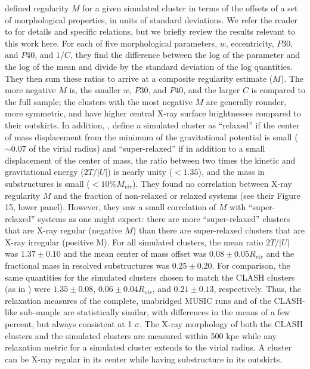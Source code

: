 \documentclass[iop,twocolumn]{emulateapj}
\begin{document}
{ \citet{meneghetti.etal.2014} defined regularity $M$ for a given simulated cluster in terms of the
offsets of a set of morphological properties, in units of standard deviations. 
We refer the reader to \citet{meneghetti.etal.2014} for
details and specific relations, but
we briefly review the results relevant to this work here. For each of five morphological parameters, 
$w$, eccentricity, $P30$, and $P40$, and $1/C$, they find the difference between the log of the parameter and
the log of the mean and divide by the standard deviation of the log quantities. 
They then sum these ratios to arrive at a composite regularity estimate ($M$). 
The more negative $M$ is, the smaller $w$, $P30$, and $P40$, and the larger $C$ is compared to the full sample; the
clusters with the most negative $M$ are generally rounder, more symmetric, and have higher central X-ray surface brightnesses compared to their outskirts. 
In addition, \citet{meneghetti.etal.2014}, define a simulated cluster as ``relaxed'' if the center of mass
displacement from the minimum of the gravitational potential is small ($\sim 0.07$ of the virial radius) 
and ``super-relaxed'' if in addition to a small displacement of the center of mass, 
the ratio between two times the kinetic and
gravitational energy ($2T/|U|$) is nearly unity ($<1.35$), and the mass in substructures is
small ($<10\% M_{vir}$). 
They found no correlation between X-ray regularity $M$ 
and the fraction of non-relaxed or  relaxed systems (see their Figure 15, lower panel). 
However, they saw a small correlation of $M$ with ``super-relaxed'' systems 
as one might expect: there are more ``super-relaxed'' clusters that are X-ray regular (negative $M$) 
than there are super-relaxed clusters that are X-ray irregular (positive M).
For all simulated clusters, the mean ratio $2T/|U|$  
was $1.37 \pm 0.10$ and the mean center of mass offset was $0.08 \pm 0.05 R_{vir}$
and the fractional mass in resolved substructures was $0.25 \pm 0.20$. 
For comparison, the same quantities for the simulated clusters chosen to match the CLASH clusters
(as in \citealt{meneghetti.etal.2014})   
were $1.35 \pm 0.08$, $0.06 \pm 0.04 R_{vir}$, and $0.21 \pm 0.13$, respectively. 
Thus, the relaxation measures of the complete, unabridged MUSIC runs and of the
CLASH-like sub-sample  are statistically similar, with differences in the means of a few
percent, but always consistent at 1 $\sigma$.
The X-ray morphology of both the CLASH clusters and the simulated clusters are measured 
within 500 kpc while any relaxation metric for a simulated cluster 
 extends to the virial radius. A cluster can be X-ray regular in its center 
 while having substructure in its outskirts. 
 
}
\end{document}
